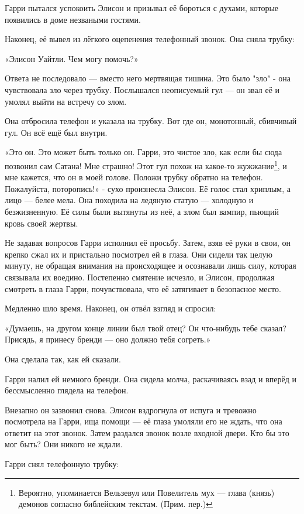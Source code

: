 \documentclass[a5paper, 9pt,
final, openany, twoside=true]{memoir}
\begin{document}
Гарри пытался успокоить Элисон и призывал её бороться с духами, которые появились в доме незваными гостями.

Наконец, её вывел из лёгкого оцепенения телефонный звонок. Она сняла трубку:\bigskip

«Элисон Уайтли. Чем могу помочь?»\bigskip

Ответа не последовало — вместо него мертвящая тишина. Это было "зло" - она чувствовала зло через трубку. Послышался неописуемый гул — он звал её и умолял выйти на встречу со злом.

Она отбросила телефон и указала на трубку. Вот где он, монотонный, сбивчивый гул. Он всё ещё был внутри.

«Это он. Это может быть только он. Гарри, это чистое зло, как если бы сюда позвонил сам Сатана! Мне страшно! Этот гул похож на какое-то жужжание\footnote[1]{Вероятно, упоминается Вельзевул или Повелитель мух — глава (князь) демонов согласно библейским текстам. (Прим. пер.)}, и мне кажется, что он в моей голове. Положи трубку обратно на телефон. Пожалуйста, поторопись!» - сухо произнесла Элисон. Её голос стал хриплым, а лицо — белее мела. Она походила на ледяную статую — холодную и безжизненную. Её силы были вытянуты из неё, а злом был вампир, пьющий кровь своей жертвы.

Не задавая вопросов Гарри исполнил её просьбу. Затем, взяв её руки в свои, он крепко сжал их и пристально посмотрел ей в глаза. Они сидели так целую минуту, не обращая внимания на происходящее и осознавали лишь силу, которая связывала их воедино. Постепенно смятение исчезло, и Элисон, продолжая смотреть в глаза Гарри, почувствовала, что её затягивает в безопасное место.

Медленно шло время. Наконец, он отвёл взгляд и спросил:

«Думаешь, на другом конце линии был твой отец? Он что-нибудь тебе сказал? Присядь, я принесу бренди — оно должно тебя согреть.»

Она сделала так, как ей сказали.

Гарри налил ей немного бренди. Она сидела молча, раскачиваясь взад и вперёд и бессмысленно глядела на телефон.

Внезапно он зазвонил снова. Элисон вздрогнула от испуга и тревожно посмотрела на Гарри, ища помощи — её глаза умоляли его не ждать, что она ответит на этот звонок. Затем раздался звонок возле входной двери. Кто бы это мог быть? Они никого не ждали.

Гарри снял телефонную трубку:
\end{document}
